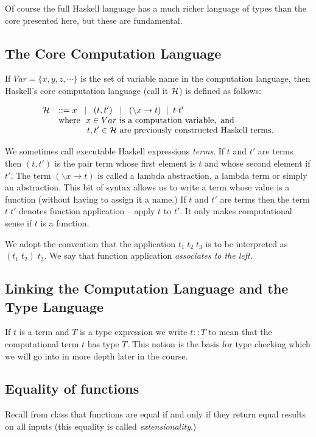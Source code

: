 \documentclass[11pt]{article}
\begin{document}
Of course the full Haskell language has a much richer language of types than
the core presented here, but these are fundamental.

\subsection{The Core Computation Language}

If $Var = \{x,y,z,\cdots\}$ is the set of variable name in the computation
language, then Haskell's core computation language (call it $\cal{H}$) is
defined as follows:

\[\begin{array}{ll}
{\cal{H}} & ::=  x \;\; \mid \;\; (t,t') \;\; \mid \;\; (\backslash x \rightarrow t) \;\;|\;\; t\;t' \\
&{\mathrm{where\ \ }} x\in{}Var {\mathrm{\ is\ a\ computation\ variable,\ and}}\\
&{\hspace{3.35em}} t,t'\in {\cal{H}} {\mathrm{\ are\ previously\ constructed\ Haskell\ terms.}}\\
\end{array}\]

We sometimes call executable Haskell expressions {\em{terms}}.  If $t$ and $t'$
are terms then $(t,t')$ is the pair term whose first element is $t$ and whose
second element if $t'$.  The term $(\backslash x \rightarrow t)$ is called a
lambda abstraction, a lambda term or simply an abstraction.  This bit of syntax
allows us to write a term whose value is a function (without having to assign
it a name.)  If $t$ and $t'$ are terms then the term $t\;t'$ denotes function
application -- apply $t$ to $t'$.  It only makes computational sense if $t$ is
a function.

We adopt the convention that the application $t_1\;{}t_2\;{}t_3$ is to be
interpreted as $(t_1\;{}t_2)\;{}t_3$.  We say that function application
{\em{associates to the left.}}


\subsection{Linking the Computation Language and the Type Language}

If $t$ is a term and $T$ is a type expression we write $t::T$ to mean that the
computational term $t$ has type $T$.  This notion is the basis for type
checking which we will go into in more depth later in the course.


\subsection{Equality of functions}
Recall from class that functions are equal if and only if they return equal
results on all inputs (this equality is called {\em{extensionality}}.)
\end{document}
